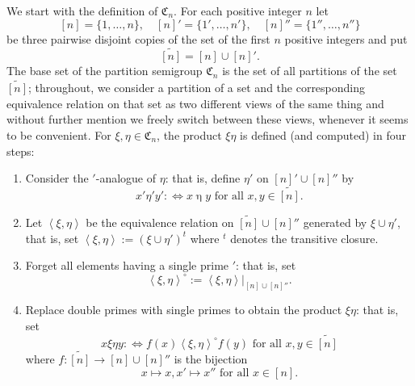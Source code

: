 \documentclass[preprint,1p,times]{elsarticle}
\numberwithin{equation}{section}
\theoremstyle{remark}
\def\C{\mathfrak{C}}
\begin{document}
We start with the definition of $\C_n$. For each positive integer $n$ let
$$[n]=\{1,\dots,n\},\quad [n]'=\{1',\dots,n'\},\quad [n]''=\{1'',\dots,n''\}$$
be three pairwise disjoint copies of the set of the first $n$ positive integers and put
$$\widetilde{[n]}=[n]\cup [n]'.$$
The base set of the partition semigroup $\C_n$ is the set of all partitions of the set $\widetilde{[n]}$; throughout, we
consider a partition of a set and the corresponding equivalence relation on that set as two different views of the same
thing and without further mention we freely switch between these views, whenever it seems to be convenient. For
$\xi,\eta\in \C_n$, the product $\xi\eta$ is defined (and computed) in four steps:
\begin{enumerate}
\item Consider the $'$-analogue of $\eta$: that is, define $\eta'$
on ${[n]'}\cup {[n]''}$ by
$${x'}\mathrel{\eta'}{y'}:\Leftrightarrow x\mathrel{\eta}
y\text{ for all } x,y\in \widetilde{[n]}.$$
\item Let $\left<\xi,\eta\right>$ be the equivalence relation on
$\widetilde{[n]}\cup {[n]''}$ generated by $\xi\cup {\eta'}$, that is, set $\left<\xi,\eta\right>:=(\xi\cup {\eta'})^t$
where $^t$ denotes the transitive closure.
\item Forget all elements having a single prime $'$: that is, set
$$\left<\xi,\eta\right>^\circ:=\left<\xi,\eta\right>|_{[n]\cup{[n]''}}.$$
\item Replace  double primes with single primes to
obtain the product $\xi\eta$: that is, set
$$x\mathrel{\xi\eta}y:\Leftrightarrow f(x)\mathrel{\left<\xi,\eta\right>^\circ}f(y)
\text{ for all }x,y\in \widetilde{[n]}$$ where $f:\widetilde{[n]}\to [n]\cup{[n]''}$ is the bijection
$$x\mapsto x, x'\mapsto x'' \text{ for all } x\in [n].$$
\end{enumerate}
\end{document}
